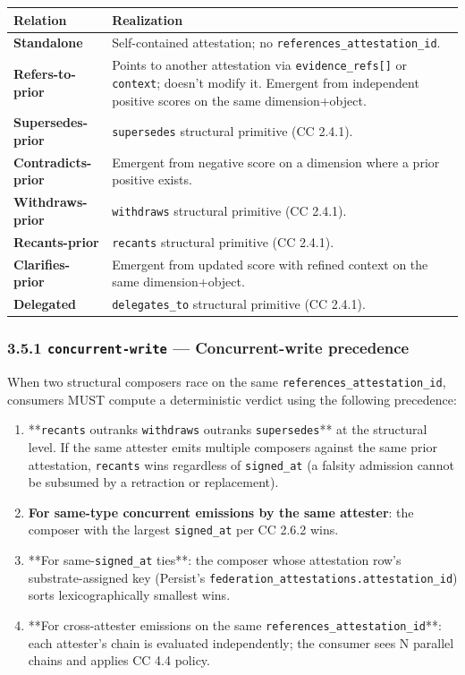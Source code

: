 \documentclass[11pt]{article}
\begin{document}
{\footnotesize
\begin{longtable}{|p{8.0cm}|p{8.0cm}|}\hline
\textbf{Relation} & \textbf{Realization} \\ \hline\endhead
\textbf{Standalone} & Self-contained attestation; no \texttt{references\_attestation\_id}. \\ \hline
\textbf{Refers-to-prior} & Points to another attestation via \texttt{evidence\_refs[]} or \texttt{context}; doesn't modify it. Emergent from independent positive scores on the same dimension+object. \\ \hline
\textbf{Supersedes-prior} & \texttt{supersedes} structural primitive (CC 2.4.1). \\ \hline
\textbf{Contradicts-prior} & Emergent from negative score on a dimension where a prior positive exists. \\ \hline
\textbf{Withdraws-prior} & \texttt{withdraws} structural primitive (CC 2.4.1). \\ \hline
\textbf{Recants-prior} & \texttt{recants} structural primitive (CC 2.4.1). \\ \hline
\textbf{Clarifies-prior} & Emergent from updated score with refined context on the same dimension+object. \\ \hline
\textbf{Delegated} & \texttt{delegates\_to} structural primitive (CC 2.4.1). \\ \hline
\end{longtable}}


\subsubsection*{3.5.1 \texttt{concurrent-write} — Concurrent-write precedence}


When two structural composers race on the same \texttt{references\_attestation\_id}, consumers MUST compute a deterministic verdict using the following precedence:


\begin{enumerate}\setlength\itemsep{0pt}
\item **\texttt{recants} outranks \texttt{withdraws} outranks \texttt{supersedes}** at the structural level. If the same attester emits multiple composers against the same prior attestation, \texttt{recants} wins regardless of \texttt{signed\_at} (a falsity admission cannot be subsumed by a retraction or replacement).
\item \textbf{For same-type concurrent emissions by the same attester}: the composer with the largest \texttt{signed\_at} per CC 2.6.2 wins.
\item **For same-\texttt{signed\_at} ties**: the composer whose attestation row's substrate-assigned key (Persist's \texttt{federation\_attestations.attestation\_id}) sorts lexicographically smallest wins.
\item **For cross-attester emissions on the same \texttt{references\_attestation\_id}**: each attester's chain is evaluated independently; the consumer sees N parallel chains and applies CC 4.4 policy.
\end{enumerate}
\end{document}
